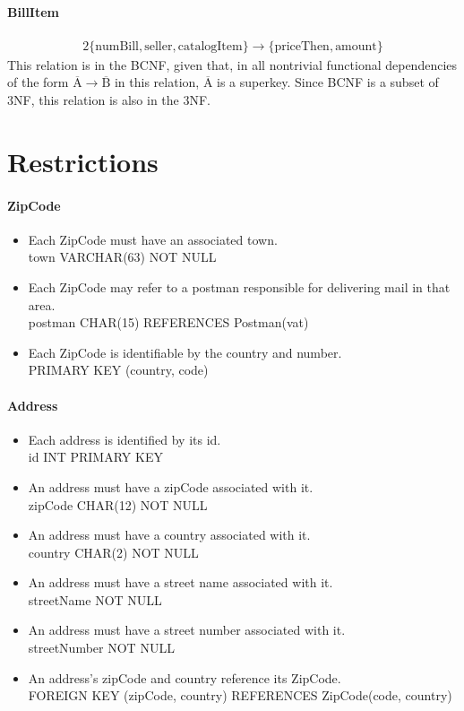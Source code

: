 \documentclass{report}[a4paper]
\theoremstyle{remark}
\begin{document}
\subsubsection{BillItem}
\begin{alignat*}{2}
\{\text{numBill},\text{seller},\text{catalogItem}\} \rightarrow \{\text{priceThen},\text{amount}\}
\end{alignat*}
This relation is in the BCNF, given that, in all nontrivial functional dependencies of the form $\overline{\text{A}} \rightarrow \overline{\text{B}}$ in this relation, $\overline{\text{A}}$ is a superkey. Since BCNF is a subset of 3NF, this relation is also in the 3NF.

\chapter{Restrictions}
\subsubsection{ZipCode}
\begin{itemize}
    \item Each ZipCode must have an associated town. \\ town VARCHAR(63) NOT NULL
    \item Each ZipCode may refer to a postman responsible for delivering mail in that area. \\ postman CHAR(15) REFERENCES Postman(vat)
    \item Each ZipCode is identifiable by the country and number. \\ PRIMARY KEY (country, code)
\end{itemize}
\subsubsection{Address}
\begin{itemize}
    \item Each address is identified by its id. \\ id INT PRIMARY KEY
    \item An address must have a zipCode associated with it. \\ zipCode CHAR(12) NOT NULL
    \item An address must have a country associated with it. \\ country CHAR(2) NOT NULL
    \item An address must have a street name associated with it. \\ streetName NOT NULL
    \item An address must have a street number associated with it. \\ streetNumber NOT NULL
    \item An address's zipCode and country reference its ZipCode. \\ FOREIGN KEY (zipCode, country) REFERENCES ZipCode(code, country)
\end{itemize}
\end{document}
